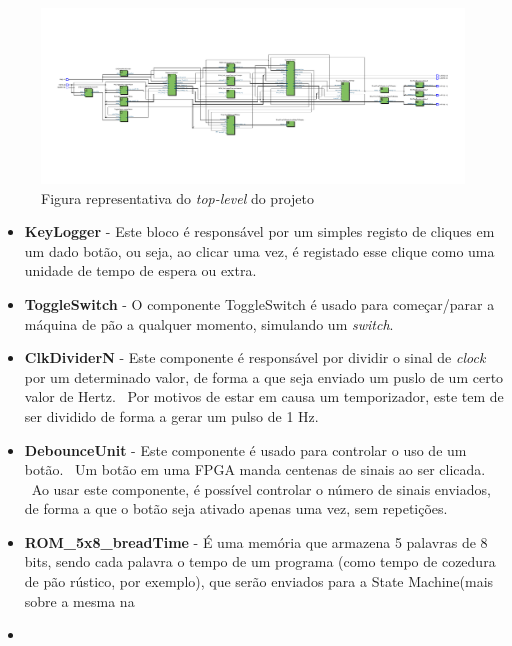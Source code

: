 \documentclass{article}
\begin{document}
        \begin{figure}[H]
            \centering
            \includegraphics[scale=0.6]{BreadMachine}
            \caption{Figura representativa do \textit{top-level} do projeto}
            \label{fig:bread-machine}
        \end{figure}

    \begin{itemize}
        \item[\textbf{\textrightarrow}] \textbf{KeyLogger} - Este bloco é responsável por um simples registo de cliques em um dado botão, ou seja, ao clicar uma vez, é registado esse clique como uma unidade de tempo de espera ou extra.
        \item[\textbf{\textrightarrow}] \textbf{ToggleSwitch} - O componente ToggleSwitch é usado para começar/parar a máquina de pão a qualquer momento, simulando um \textit{switch}.
        \item[\textbf{\textrightarrow}] \textbf{ClkDividerN} - Este componente é responsável por dividir o sinal de \textit{clock} por um determinado valor, de forma a que seja enviado um puslo  de um certo valor de Hertz. \ Por motivos de estar em causa um temporizador, este tem de ser dividido de forma a gerar um pulso de 1 Hz.
        \item[\textbf{\textrightarrow}] \textbf{DebounceUnit} - Este componente é usado para controlar o uso de um botão. \ Um botão em uma FPGA manda centenas de sinais ao ser clicada. \ Ao usar este componente, é possível controlar o número de sinais enviados, de forma a que o botão seja ativado apenas uma vez, sem repetições.
        \item[\textbf{\textrightarrow}] \textbf{ROM\_5x8\_breadTime} - É uma memória que armazena 5 palavras de 8 bits, sendo cada palavra o tempo de um programa (como tempo de cozedura de pão rústico, por exemplo), que serão enviados para a State Machine(mais sobre a mesma na %
        \item[\textbf{\textrightarrow}] \textbf{} 
    \end{itemize}
\end{document}
